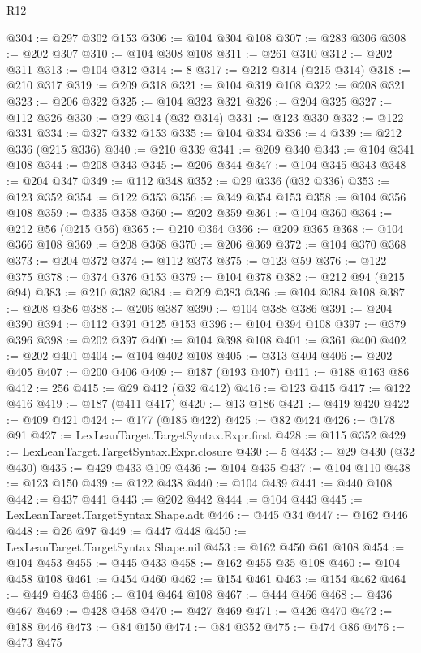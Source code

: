 \begin{lexlean}{R12}
\begin{coremodule}
@304 := @297 @302 @153
@306 := @104 @304 @108
@307 := @283 @306
@308 := @202 @307
@310 := @104 @308 @108
@311 := @261 @310
@312 := @202 @311
@313 := @104 @312
@314 := 8
@317 := @212 @314 (@215 @314)
@318 := @210 @317
@319 := @209 @318
@321 := @104 @319 @108
@322 := @208 @321
@323 := @206 @322
@325 := @104 @323 @321
@326 := @204 @325
@327 := @112 @326
@330 := @29 @314 (@32 @314)
@331 := @123 @330
@332 := @122 @331
@334 := @327 @332 @153
@335 := @104 @334
@336 := 4
@339 := @212 @336 (@215 @336)
@340 := @210 @339
@341 := @209 @340
@343 := @104 @341 @108
@344 := @208 @343
@345 := @206 @344
@347 := @104 @345 @343
@348 := @204 @347
@349 := @112 @348
@352 := @29 @336 (@32 @336)
@353 := @123 @352
@354 := @122 @353
@356 := @349 @354 @153
@358 := @104 @356 @108
@359 := @335 @358
@360 := @202 @359
@361 := @104 @360
@364 := @212 @56 (@215 @56)
@365 := @210 @364
@366 := @209 @365
@368 := @104 @366 @108
@369 := @208 @368
@370 := @206 @369
@372 := @104 @370 @368
@373 := @204 @372
@374 := @112 @373
@375 := @123 @59
@376 := @122 @375
@378 := @374 @376 @153
@379 := @104 @378
@382 := @212 @94 (@215 @94)
@383 := @210 @382
@384 := @209 @383
@386 := @104 @384 @108
@387 := @208 @386
@388 := @206 @387
@390 := @104 @388 @386
@391 := @204 @390
@394 := @112 @391 @125 @153
@396 := @104 @394 @108
@397 := @379 @396
@398 := @202 @397
@400 := @104 @398 @108
@401 := @361 @400
@402 := @202 @401
@404 := @104 @402 @108
@405 := @313 @404
@406 := @202 @405
@407 := @200 @406
@409 := @187 (@193 @407)
@411 := @188 @163 @86
@412 := 256
@415 := @29 @412 (@32 @412)
@416 := @123 @415
@417 := @122 @416
@419 := @187 (@411 @417)
@420 := @13 @186
@421 := @419 @420
@422 := @409 @421
@424 := @177 (@185 @422)
@425 := @82 @424
@426 := @178 @91
@427 := LexLeanTarget.TargetSyntax.Expr.first
@428 := @115 @352
@429 := LexLeanTarget.TargetSyntax.Expr.closure
@430 := 5
@433 := @29 @430 (@32 @430)
@435 := @429 @433 @109
@436 := @104 @435
@437 := @104 @110
@438 := @123 @150
@439 := @122 @438
@440 := @104 @439
@441 := @440 @108
@442 := @437 @441
@443 := @202 @442
@444 := @104 @443
@445 := LexLeanTarget.TargetSyntax.Shape.adt
@446 := @445 @34
@447 := @162 @446
@448 := @26 @97
@449 := @447 @448
@450 := LexLeanTarget.TargetSyntax.Shape.nil
@453 := @162 @450 @61 @108
@454 := @104 @453
@455 := @445 @433
@458 := @162 @455 @35 @108
@460 := @104 @458 @108
@461 := @454 @460
@462 := @154 @461
@463 := @154 @462
@464 := @449 @463
@466 := @104 @464 @108
@467 := @444 @466
@468 := @436 @467
@469 := @428 @468
@470 := @427 @469
@471 := @426 @470
@472 := @188 @446
@473 := @84 @150
@474 := @84 @352
@475 := @474 @86
@476 := @473 @475

\end{coremodule}
\end{lexlean}
